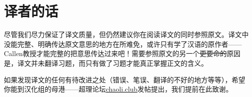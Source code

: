 \chapter*{译者的话}
尽管我们尽力保证了译文质量，但仍然建议你在阅读译文的同时参照原文。译文中没能完整、明确传达原文意思的地方在所难免，或许只有学了汉语的原作者——Callen教授才能完整的把意思传达过来吧！需要参照原文的另一个\sout{更要命的}原因是，译文并未翻译习题，而只有做了习题才能真正掌握正文的含义。

如果发现译文的任何有待改进之处（错误、笔误、翻译的不好的地方等等），希望你能到汉化组的母港——超理论坛\url{chaoli.club}发帖提出，我们提前在此致谢。